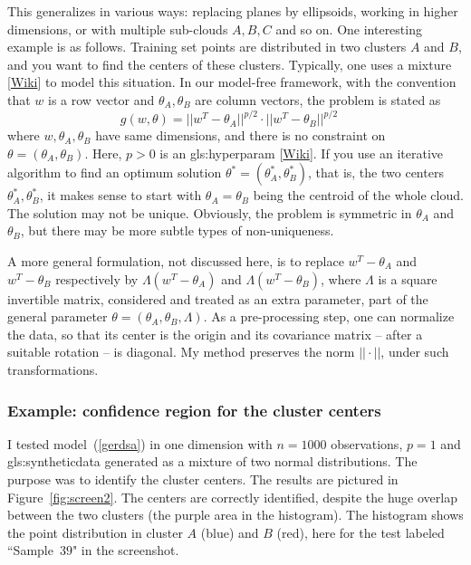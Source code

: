 \documentclass[oneside,10pt]{book}
\begin{document}
This generalizes in various ways: replacing planes by ellipsoids, working in higher dimensions, or with multiple sub-clouds
 $A, B, C$ and so on. One interesting example is as follows. Training set points are distributed in two clusters $A$ and $B$, and you want to find the centers of these clusters. Typically, one uses a \textcolor{index}{mixture} [\href{https://en.wikipedia.org/wiki/Mixture_model}{Wiki}] to model this situation.
 In our model-free framework, with the convention that $w$ is a row vector and $\theta_A,\theta_B$ are column vectors, the problem is stated as 
\begin{equation}
g(w,\theta)=||w^T-\theta_A||^{p/2} \cdot ||w^T-\theta_B||^{p/2} \quad \label{gerdsa}
\end{equation}
where $w, \theta_A, \theta_B$ have same dimensions, and there is no constraint on $\theta=(\theta_A,\theta_B)$. Here, $p>0$ is an \gls{gls:hyperparam} [\href{https://en.wikipedia.org/wiki/Hyperparameter_(machine_learning)}{Wiki}]. 
If you use an iterative algorithm to find an optimum solution $\theta^*=(\theta_A^*,\theta_B^*)$, that is, the two centers $\theta_A^*,\theta_B^*$, it makes sense to start with
 $\theta_A=\theta_B$ being the centroid of the whole cloud. The solution may not be unique. Obviously, the problem is symmetric in $\theta_A$ and 
$\theta_B$, but there may be more subtle types of non-uniqueness. 

A more general formulation, not discussed here, is to replace $w^T-\theta_A$ and $w^T-\theta_B$ respectively by 
$\Lambda(w^T-\theta_A)$ and $\Lambda(w^T-\theta_B)$, where $\Lambda$ is a square invertible matrix, considered and treated as an extra parameter,
 part of the general parameter $\theta=(\theta_A,\theta_B,\Lambda)$. As a pre-processing step, one can normalize the data, so that its center is the origin and its covariance matrix -- after a suitable rotation -- is diagonal. My method preserves the norm $||\cdot||$, under such transformations.  

\subsubsection{Example: confidence region for the cluster centers}\label{reserse}

I tested model~(\ref{gerdsa}) in one dimension with $n=1000$ observations, 
 $p=1$ and \gls{gls:syntheticdata} generated as a mixture of two normal distributions. The purpose was to identify the cluster centers. The results are pictured in Figure~\ref{fig:screen2}.  The centers are correctly identified, despite the huge overlap between the two clusters (the purple area in the histogram). 
The histogram shows the point distribution in cluster $A$ (blue) and $B$ (red), here for the test labeled ``Sample~$39$" in the screenshot.
\end{document}
